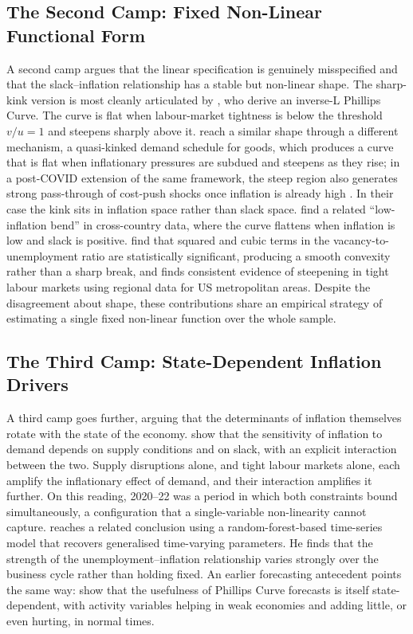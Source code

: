 \documentclass[12pt,a4paper]{article}
\begin{document}
\subsection{The Second Camp: Fixed Non-Linear Functional Form}
\label{subsec:camp2}

A second camp argues that the linear specification is genuinely misspecified and that the slack--inflation relationship has a stable but non-linear shape. The sharp-kink version is most cleanly articulated by \citet{benigno2023}, who derive an inverse-L Phillips Curve. The curve is flat when labour-market tightness is below the threshold $v/u = 1$ and steepens sharply above it. \citet{harding2022} reach a similar shape through a different mechanism, a quasi-kinked demand schedule for goods, which produces a curve that is flat when inflationary pressures are subdued and steepens as they rise; in a post-COVID extension of the same framework, the steep region also generates strong pass-through of cost-push shocks once inflation is already high \citep{harding2023post}. In their case the kink sits in inflation space rather than slack space. \citet{forbes2022} find a related ``low-inflation bend'' in cross-country data, where the curve flattens when inflation is low and slack is positive. \citet{ball2022} find that squared and cubic terms in the vacancy-to-unemployment ratio are statistically significant, producing a smooth convexity rather than a sharp break, and \citet{gitti2024} finds consistent evidence of steepening in tight labour markets using regional data for US metropolitan areas. Despite the disagreement about shape, these contributions share an empirical strategy of estimating a single fixed non-linear function over the whole sample.

\subsection{The Third Camp: State-Dependent Inflation Drivers}
\label{subsec:camp3}

A third camp goes further, arguing that the determinants of inflation themselves rotate with the state of the economy. \citet{cbo2023} show that the sensitivity of inflation to demand depends on supply conditions and on slack, with an explicit interaction between the two. Supply disruptions alone, and tight labour markets alone, each amplify the inflationary effect of demand, and their interaction amplifies it further. On this reading, 2020--22 was a period in which both constraints bound simultaneously, a configuration that a single-variable non-linearity cannot capture. \citet{coulombe2024} reaches a related conclusion using a random-forest-based time-series model that recovers generalised time-varying parameters. He finds that the strength of the unemployment--inflation relationship varies strongly over the business cycle rather than holding fixed. An earlier forecasting antecedent points the same way: \citet{dotsey2018} show that the usefulness of Phillips Curve forecasts is itself state-dependent, with activity variables helping in weak economies and adding little, or even hurting, in normal times.
\end{document}
